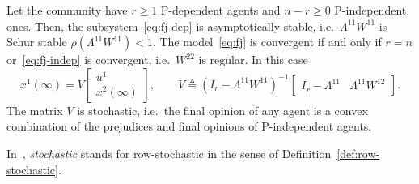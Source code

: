 \begin{theorem}
\label{thm:fj-general}
Let the community have $r \geq 1$ P-dependent agents and $n - r \geq 0$
P-independent ones. Then, the subsystem~\eqref{eq:fj-dep} is asymptotically stable,
i.e.\ $\Lambda^{11} W^{11}$ is Schur stable $\rho(\Lambda^{11} W^{11}) < 1$. The
model~\eqref{eq:fj} is convergent if and only if $r = n$ or~\eqref{eq:fj-indep} is
convergent, i.e.\ $W^{22}$ is regular. In this case
\begin{equation}\label{eq:fj-V}
  x^1(\infty) = V \begin{bmatrix} u^1 \\ x^2(\infty) \end{bmatrix}, \qquad
  V \triangleq (I_r - \Lambda^{11} W^{11})^{-1}
      \begin{bmatrix} I_r - \Lambda^{11} & \Lambda^{11} W^{12} \end{bmatrix}.
\end{equation}
The matrix $V$ is stochastic, i.e.\ the final opinion of any agent is a convex
combination of the prejudices and final opinions of P-independent agents.
\end{theorem}

In~\cite{proskurnikov2017tutorial}, \emph{stochastic} stands for row-stochastic in the
sense of Definition~\ref{def:row-stochastic}.

